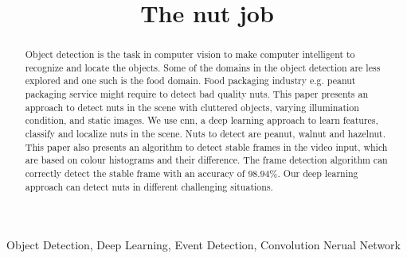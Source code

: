 \documentclass[journal,onecolumn,12pt]{IEEEtran}
\begin{document}
\title{The nut job\\
{\footnotesize }%
}

\author{
}

\maketitle

\begin{abstract}
Object detection is the task in computer vision to make computer intelligent to recognize and locate the objects. Some of the domains in the object detection are less explored and one such is the food domain. Food packaging industry e.g. peanut packaging service might require to detect bad quality nuts. This paper presents an approach to detect nuts in the scene with cluttered objects, varying illumination condition, and static images. We use \gls{cnn}, a deep learning approach to learn features, classify and localize nuts in the scene. Nuts to detect are peanut, walnut and hazelnut. This paper also presents an algorithm to detect stable frames in the video input, which are based on colour histograms and their difference. The frame detection algorithm can correctly detect the stable frame with an accuracy of 98.94\%. Our deep learning approach can detect nuts in different challenging situations.
\end{abstract}

\begin{IEEEkeywords}
Object Detection, Deep Learning, Event Detection, Convolution Nerual Network
\end{IEEEkeywords}
\end{document}
